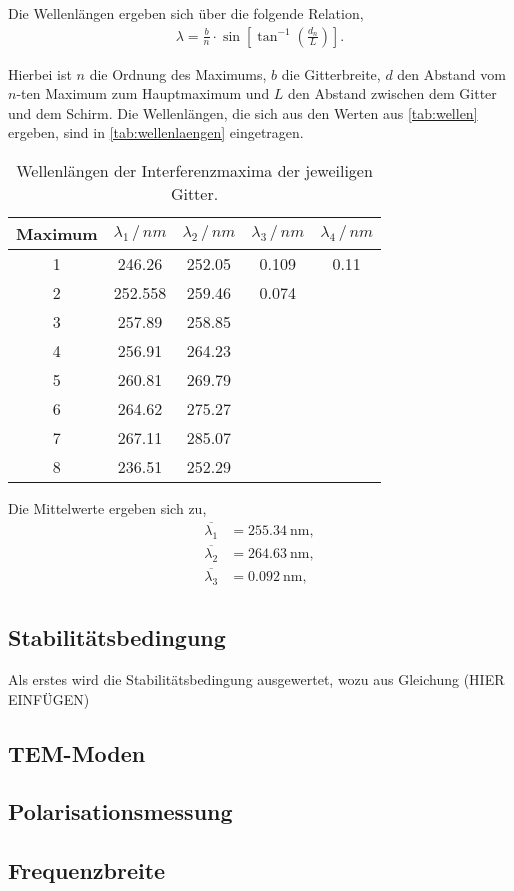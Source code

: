 \noindent
Die Wellenlängen ergeben sich über die folgende Relation,
\begin{align}
  \lambda = \frac{b}{n}\cdot\sin\left[\tan^{-1}\left(\frac{d_n}{L}\right)\right].
\end{align}

\noindent
Hierbei ist $n$ die Ordnung des Maximums, $b$ die Gitterbreite, $d$ den Abstand vom $n$-ten Maximum zum Hauptmaximum und $L$ den Abstand zwischen dem Gitter und dem Schirm.
Die Wellenlängen, die sich aus den Werten aus \autoref{tab:wellen} ergeben, sind in \autoref{tab:wellenlaengen} eingetragen.

\begin{table}[H]
  \centering
  \caption{Wellenlängen der Interferenzmaxima der jeweiligen Gitter.}
  \label{tab:wellenlaengen}
  \begin{tabular}{c c c c c}
      \toprule
      Maximum & $\lambda_1 \,/\,\si{nm}$ & $\lambda_2 \,/\,\si{nm}$ & $\lambda_3 \,/\,\si{nm}$ & $\lambda_4 \,/\,\si{nm}$\\
      \midrule
      1 & 246.26 & 252.05   & 0.109   & 0.11  \\  
      2 & 252.558 & 259.46   & 0.074  &       \\  
      3 & 257.89 & 258.85   &       &       \\  
      4 & 256.91 & 264.23 &       &       \\
      5 & 260.81 & 269.79 &       &       \\
      6 & 264.62 & 275.27 &       &       \\
      7 & 267.11 & 285.07 &       &       \\
      8 & 236.51 & 252.29 &       &       \\
      \bottomrule
  \end{tabular}
\end{table}



Die Mittelwerte ergeben sich zu,
\begin{align}
  \overline{\lambda_1} &= \SI{255.34}{\nano\meter}, \\
  \overline{\lambda_2} &= \SI{264.63}{\nano\meter}, \\
  \overline{\lambda_3} &= \SI{0.092}{\nano\meter}, \\
\end{align}

\subsection{Stabilitätsbedingung}
\label{subsec:Stabilitätsbedingung}
Als erstes wird die Stabilitätsbedingung ausgewertet, wozu aus Gleichung (HIER EINFÜGEN)


\subsection{TEM-Moden}
\label{subsec:TEM}


\subsection{Polarisationsmessung}
\label{subsec:Polarisationsmessung}

\subsection{Frequenzbreite}
\label{subsec:Frequenzbreite}


